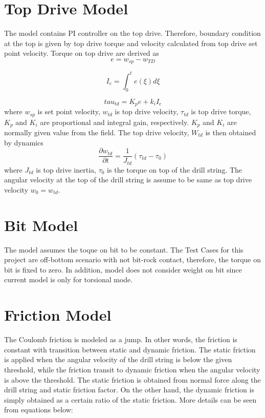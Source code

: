 \section{Top Drive Model}
The model contains PI controller on the top drive. Therefore, boundary condition at the top is given by top drive torque and velocity calculated from top drive set point velocity. Torque on top drive are derived as
\begin{equation}\label{AS_err}
  e = w_{sp} - w_{TD}
\end{equation}

\begin{equation}\label{AS_Ie}
  I_e = \int_{0}^{t}e(\xi)d\xi
\end{equation}

\begin{equation}\label{AS_tau_m}
  tau_{td} = K_pe + k_iI_e
\end{equation}
where $w_{sp}$ is set point velocity, $w_{td}$ is top drive velocity, $\tau_{td}$ is top drive torque, $K_p$ and $K_i$ are proportional and integral gain, respectively. $K_p$ and $K_i$ are normally given value from the field. The top drive velocity, $W_{td}$ is then obtained by dynamics
\begin{equation}\label{AS_w_td}
  \frac{\partial w_{td}}{\partial t} = \frac{1}{J_{td}}(\tau_{td} - \tau_0)
\end{equation}
where $J_{td}$ is top drive inertia, $\tau_{0}$ is the torque on top of the drill string. The angular velocity at the top of the drill string is assume to be same as top drive velocity $w_0 = w_{td}$.

\section{Bit Model}
The model assumes the toque on bit to be constant. The Test Cases for this project are off-bottom scenario with not bit-rock contact, therefore, the torque on bit is fixed to zero. In addition, model does not consider weight on bit since current model is only for torsional mode. 

\section{Friction Model}
The Coulomb friction is modeled as a jump. In other words, the friction is constant with transition between static and dynamic friction. The static friction is applied when the angular velocity of the drill string is below the given threshold, while the friction transit to dynamic friction when the angular velocity is above the threshold. The static friction is obtained from normal force along the drill string and static friction factor. On the other hand, the dynamic friction is simply obtained as a certain ratio of the static friction. More details can be seen from equations below:

